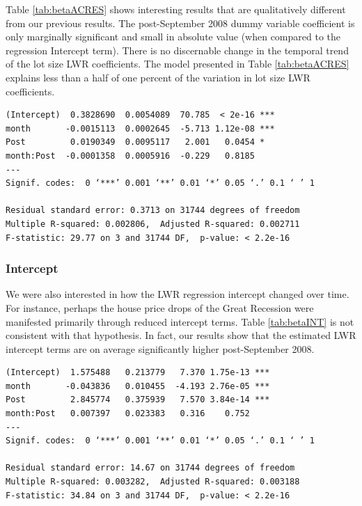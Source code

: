 \documentclass{article}\usepackage{graphicx, color}
\begin{document}
Table \ref{tab:betaACRES} shows interesting results that are qualitatively different from our previous results. The post-September 2008 dummy variable coefficient is only marginally significant and small in absolute value (when compared to the regression Intercept term). There is no discernable change in the temporal trend of the lot size LWR coefficients. The model presented in Table \ref{tab:betaACRES} explains less than a half of one percent of the variation in lot size LWR coefficients.

\begin{table}[h]
\caption{Regression Results: Dependent Variable = Lot Size LWR Coefficients}\label{tab:betaACRES}
\begin{verbatim}
(Intercept)  0.3828690  0.0054089  70.785  < 2e-16 ***
month       -0.0015113  0.0002645  -5.713 1.12e-08 ***
Post         0.0190349  0.0095117   2.001   0.0454 *  
month:Post  -0.0001358  0.0005916  -0.229   0.8185    
---
Signif. codes:  0 ‘***’ 0.001 ‘**’ 0.01 ‘*’ 0.05 ‘.’ 0.1 ‘ ’ 1 

Residual standard error: 0.3713 on 31744 degrees of freedom
Multiple R-squared: 0.002806,  Adjusted R-squared: 0.002711 
F-statistic: 29.77 on 3 and 31744 DF,  p-value: < 2.2e-16 
\end{verbatim}
\end{table}

\subsubsection{Intercept}
We were also interested in how the LWR regression intercept changed over time. For instance, perhaps the house price drops of the Great Recession were manifested primarily through reduced intercept terms. Table \ref{tab:betaINT} is not consistent with that hypothesis. In fact, our results show that the estimated LWR intercept terms are on average significantly higher post-September 2008.
\begin{table}[h]
\caption{Regression Results: Dependent Variable = LWR Intercept Estimates}\label{tab:betaINT}
\begin{verbatim}
(Intercept)  1.575488   0.213779   7.370 1.75e-13 ***
month       -0.043836   0.010455  -4.193 2.76e-05 ***
Post         2.845774   0.375939   7.570 3.84e-14 ***
month:Post   0.007397   0.023383   0.316    0.752    
---
Signif. codes:  0 ‘***’ 0.001 ‘**’ 0.01 ‘*’ 0.05 ‘.’ 0.1 ‘ ’ 1 

Residual standard error: 14.67 on 31744 degrees of freedom
Multiple R-squared: 0.003282,  Adjusted R-squared: 0.003188 
F-statistic: 34.84 on 3 and 31744 DF,  p-value: < 2.2e-16  
\end{verbatim}
\end{table}
\end{document}
